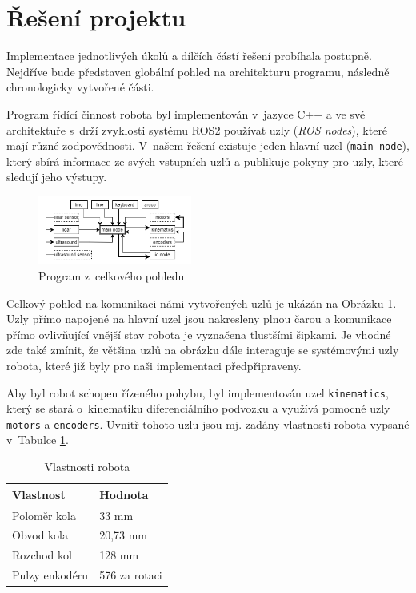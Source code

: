 \section{Řešení projektu}

Implementace jednotlivých úkolů a dílčích částí řešení probíhala postupně. Nejdříve bude představen globální pohled na architekturu programu, následně chronologicky vytvořené části.

Program řídící činnost robota byl implementován v~jazyce C++ a ve své architektuře s~drží zvyklosti systému ROS2 \cite{ros} používat uzly (\textit{ROS nodes}), které mají různé zodpovědnosti. V~našem řešení existuje jeden hlavní uzel (\texttt{main node}), který sbírá informace ze svých vstupních uzlů a publikuje pokyny pro uzly, které sledují jeho výstupy. 

\begin{figure}[h]
    \centering
    \includegraphics[width=0.45\textwidth]{images/nodes_schematic.png}
    \caption{Program z~celkového pohledu}
    \label{fig:program_obr}
\end{figure}

Celkový pohled na komunikaci námi vytvořených uzlů je ukázán na Obrázku \ref{fig:program_obr}. Uzly přímo napojené na hlavní uzel jsou nakresleny plnou čarou a komunikace přímo ovlivňující vnější stav robota je vyznačena tlustšími šipkami. Je vhodné zde také zmínit, že většina uzlů na obrázku dále interaguje se systémovými uzly robota, které již byly pro naši implementaci předpřipraveny.

Aby byl robot schopen řízeného pohybu, byl implementován uzel \texttt{kinematics}, který se stará o~kinematiku diferenciálního podvozku a využívá pomocné uzly \texttt{motors} a \texttt{encoders}. Uvnitř tohoto uzlu jsou mj. zadány vlastnosti robota vypsané v~Tabulce \ref{tab:vlastnosi}.

\begin{table}[]
    \centering
    \begin{tabular}{|l|l|}
        \hline
        \textbf{Vlastnost} & \textbf{Hodnota} \\ \hline
        Poloměr kola & 33 mm \\ \hline
        Obvod kola & 20,73 mm \\ \hline
        Rozchod kol & 128 mm \\ \hline
        Pulzy enkodéru & 576 za rotaci \\ \hline
    \end{tabular}
    \caption{Vlastnosti robota}
    \label{tab:vlastnosi}
\end{table}

